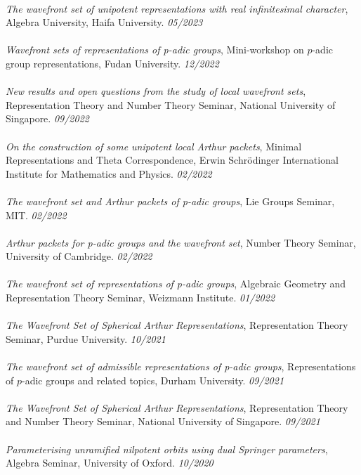 \documentclass{article}
\begin{document}
\\
{\it The wavefront set of unipotent representations with real infinitesimal character}, Algebra University, Haifa University. \hfill {\it 05/2023\/} \\
\\
{\it 
Wavefront sets of representations of p-adic groups}, Mini-workshop on $p$-adic group representations, Fudan University. \hfill {\it 12/2022\/} \\
\\
{\it 
New results and open questions from the study of local wavefront sets}, Representation Theory and Number Theory Seminar, National University of Singapore. \hfill {\it 09/2022\/} \\
\\
{\it 
On the construction of some unipotent local Arthur packets}, Minimal Representations and Theta Correspondence, Erwin Schr{\"o}dinger International Institute for Mathematics and Physics. \hfill {\it 02/2022\/} \\
\\
{\it 
The wavefront set and Arthur packets of p-adic groups}, Lie Groups Seminar, MIT. \hfill {\it 02/2022\/} \\
\\
{\it Arthur packets for p-adic groups and the wavefront set}, Number Theory Seminar, University of Cambridge. \hfill {\it 02/2022\/} \\
\\
{\it The wavefront set of representations of p-adic groups}, Algebraic Geometry and Representation Theory Seminar, Weizmann Institute. \hfill {\it 01/2022\/} \\
\\
{\it The Wavefront Set of Spherical Arthur Representations}, Representation Theory Seminar, Purdue University. \hfill {\it 10/2021\/} \\
\\
{\it The wavefront set of admissible representations of p-adic groups}, Representations of $p$-adic groups and related topics, Durham University. \hfill {\it 09/2021\/} \\
\\
{\it The Wavefront Set of Spherical Arthur Representations}, Representation Theory and Number Theory Seminar, National University of Singapore. \hfill {\it 09/2021\/} \\
\\
{\it  
Parameterising unramified nilpotent orbits using dual Springer parameters}, Algebra Seminar, University of Oxford. \hfill {\it 10/2020\/} \\
\end{document}
